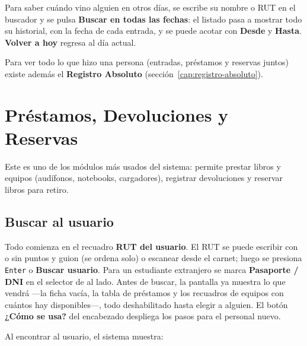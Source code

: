 \documentclass[11pt,a4paper]{report}
\begin{document}
Para saber cuándo vino alguien en otros días, se escribe su nombre o RUT en
el buscador y se pulsa \textbf{Buscar en todas las fechas}: el listado pasa
a mostrar todo su historial, con la fecha de cada entrada, y se puede
acotar con \textbf{Desde} y \textbf{Hasta}. \textbf{Volver a hoy} regresa
al día actual.

\begin{nota}
Para ver todo lo que hizo una persona (entradas, préstamos y reservas
juntos) existe además el \textbf{Registro Absoluto}
(sección~\ref{cap:registro-absoluto}).
\end{nota}

\chapter{Préstamos, Devoluciones y Reservas}

Este es uno de los módulos más usados del sistema: permite prestar
libros y equipos (audífonos, notebooks, cargadores), registrar
devoluciones y reservar libros para retiro.


\section{Buscar al usuario}

Todo comienza en el recuadro \textbf{RUT del usuario}. El RUT se puede
escribir con o sin puntos y guion (se ordena solo) o escanear desde el
carnet; luego se presiona \texttt{Enter} o \textbf{Buscar usuario}. Para un
estudiante extranjero se marca \textbf{Pasaporte / DNI} en el selector de
al lado. Antes
de buscar, la pantalla ya muestra lo que vendrá ---la ficha vacía, la tabla
de préstamos y los recuadros de equipos con cuántos hay disponibles---, todo
deshabilitado hasta elegir a alguien. El botón \textbf{¿Cómo se usa?} del
encabezado despliega los pasos para el personal nuevo.


Al encontrar al usuario, el sistema muestra:
\end{document}
